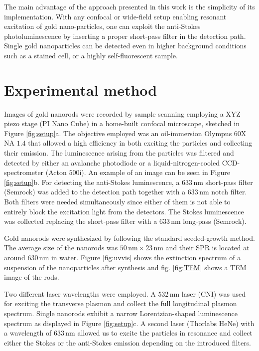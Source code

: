 \documentclass[journal=nalefd,manuscript=letter]{achemso}
\newcommand{\nm}{\ensuremath{\,\textrm{nm}}}
\begin{document}
The main advantage of the approach presented in this work is the simplicity of
its implementation. With any confocal or wide-field setup enabling resonant excitation
of gold nano-particles, one can exploit the anti-Stokes photoluminescence by inserting a
proper short-pass filter in the detection path. Single gold nanoparticles can be detected even in
higher background conditions such as a stained cell, or a highly
self-fluorescent sample.

\section{Experimental method}
Images of gold nanorods were recorded by sample scanning employing a XYZ piezo
stage (PI Nano Cube) in a  home-built confocal microscope, sketched in Figure
\ref{fig:setup}a. The objective employed was an oil-immersion Olympus 60X NA
$1.4$ that allowed a high efficiency in both exciting the particles and
collecting their emission. The luminescence arising from the particles was
filtered and detected by either an avalanche photodiode or a
liquid-nitrogen-cooled CCD-spectrometer (Acton $500\textrm{i}$). An example of
an image can be seen in Figure \ref{fig:setup}b. For detecting the anti-Stokes
luminescence, a $633\nm$ short-pass filter (Semrock) was added to the detection
path together with a $633\nm$ notch filter. Both filters were needed
simultaneously since either of them is not able to entirely block the excitation
light from the detectors. The Stokes luminescence was collected replacing the
short-pass filter with a $633\nm$ long-pass (Semrock).

Gold nanorods were synthesized by following the standard seeded-growth
method\cite{Nikoobakht2003}. The average size of the nanorods was $50\nm\times
23\nm$ and their SPR is located at around $630\nm$ in water. Figure
\ref{fig:uvvis} shows the extinction spectrum of a suspension of the
nanoparticles after synthesis and fig. \ref{fig:TEM} shows a TEM image of the
rods.

Two different laser wavelengths were employed. A $532\nm$ laser (CNI) was
used for exciting the transverse plasmon and collect the full longitudinal
plasmon spectrum. Single nanorods exhibit a narrow Lorentzian-shaped luminescence spectrum as displayed
in Figure \ref{fig:setup}c. A second laser (Thorlabs HeNe) with a wavelength of
$633\nm$ allowed us to excite the particles in resonance and collect either the
Stokes or the anti-Stokes emission depending on the introduced filters.
\end{document}
